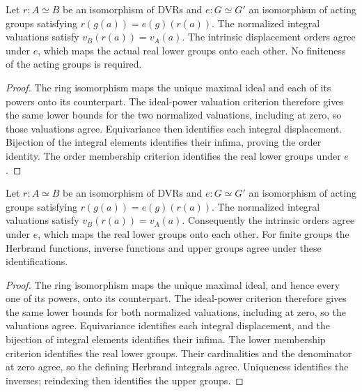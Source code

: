 \begin{lemma}
\label{fw:ramification-dvr-lower-equiv}
\leanok
Let $r:A\simeq B$ be an isomorphism of DVRs and $e:G\simeq G'$ an
isomorphism of acting groups satisfying $r(g(a))=e(g)(r(a))$.
The normalized integral valuations satisfy $v_B(r(a))=v_A(a)$.
The intrinsic displacement orders agree under $e$, which maps the
actual real lower groups onto each other. No finiteness of the
acting groups is required.
\end{lemma}
\begin{proof}
The ring isomorphism maps the unique maximal ideal and each of its
powers onto its counterpart. The ideal-power valuation criterion
therefore gives the same lower bounds for the two normalized
valuations, including at zero, so those valuations agree.
Equivariance then identifies each integral displacement. Bijection
of the integral elements identifies their infima, proving the order
identity. The order membership criterion identifies the real lower
groups under $e$.
\end{proof}

\begin{lemma}
\label{fw:ramification-dvr-equiv}
\leanok
Let $r:A\simeq B$ be an isomorphism of DVRs and $e:G\simeq G'$ an
isomorphism of acting groups satisfying $r(g(a))=e(g)(r(a))$.
The normalized integral valuations satisfy $v_B(r(a))=v_A(a)$.
Consequently the intrinsic orders agree under $e$, which maps the real
lower groups onto each other. For finite groups the Herbrand functions,
inverse functions and upper groups agree under these identifications.
\end{lemma}
\begin{proof}
The ring isomorphism maps the unique maximal ideal, and hence every one
of its powers, onto its counterpart. The ideal-power criterion therefore
gives the same lower bounds for both normalized valuations, including
at zero, so the valuations agree. Equivariance identifies each integral
displacement, and the bijection of integral elements identifies their
infima. The lower membership criterion identifies the real lower groups.
Their cardinalities and the denominator at zero agree, so the defining
Herbrand integrals agree. Uniqueness identifies the inverses; reindexing
then identifies the upper groups.
\end{proof}

